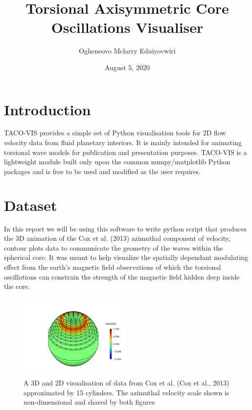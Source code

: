 \documentclass{article}
\title{Torsional Axisymmetric Core Oscillations Visualiser}
\author{Ogheneovo Mclarry Eduiyovwiri}
\date{August 5, 2020}
\begin{document}
\maketitle
\section{Introduction}
TACO-VIS provides a simple set of Python visualisation tools for 2D flow velocity data from fluid planetary interiors. It is mainly intended for animating torsional wave models for publication and presentation purposes. TACO-VIS is a lightweight module built only upon the common numpy/matplotlib Python packages and is free to be used and modified as the user requires.


\section{Dataset}

In this report we will be using this  software to write python script that produces the 3D animation of the Cox et al. (2013) azimuthal component of velocity, contour plots data to communicate the geometry of the waves within the spherical core.
It was meant to help visualize the spatially dependant modulating effect from the earth's magnetic field observations of which the torsional oscillations can constrain the strength of the magnetic field hidden deep inside the core.


\begin{figure}[h]
	    \centering
	        \includegraphics[width=0.5\textwidth]{myplot1.png}
		        \caption{A 3D and 2D visualisation of data from Cox et al. (Cox et al., 2013) approximated by 15 cylinders. The azimuthal velocity scale shown is non-dimensional and shared by both figures}
			    \label{fig:mesh1}
\end{figure}
 
\end{document}
